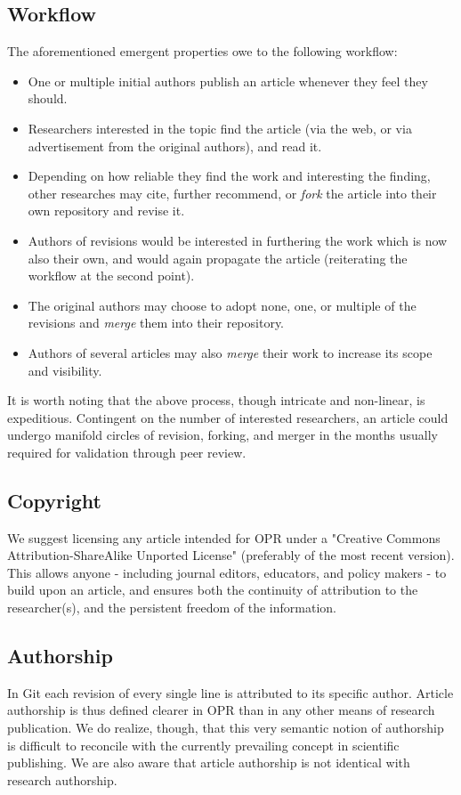 \subsection{Workflow}
The aforementioned emergent properties owe to the following workflow:
\begin{itemize}
	\item One or multiple initial authors publish an article whenever they feel they should.
	\item Researchers interested in the topic find the article (via the web, or via advertisement from the original authors), and read it.
	\item Depending on how reliable they find the work and interesting the finding, other researches may cite, further recommend, or \textit{fork} the article into their own repository and revise it.
	\item Authors of revisions would be interested in furthering the work which is now also their own, and would again propagate the article (reiterating the workflow at the second point).
	\item The original authors may choose to adopt none, one, or multiple of the revisions and \textit{merge} them into their repository.
	\item Authors of several articles may also \textit{merge} their work to increase its scope and visibility.
\end{itemize}
It is worth noting that the above process, though intricate and non-linear, is expeditious.
Contingent on the number of interested researchers, an article could undergo manifold circles of revision, forking, and merger in the months usually required for validation through peer review.
\subsection{Copyright}
We suggest licensing any article intended for OPR under a "Creative Commons Attribution-ShareAlike Unported License" (preferably of the most recent version).
This allows anyone - including journal editors, educators, and policy makers - to build upon an article, and ensures both the continuity of attribution to the researcher(s), and the persistent freedom of the information.
\subsection{Authorship}
In Git each revision of every single line is attributed to its specific author.
Article authorship is thus defined clearer in OPR than in any other means of research publication.
We do realize, though, that this very semantic notion of authorship is difficult to reconcile with the currently prevailing concept in scientific publishing.
We are also aware that article authorship is not identical with research authorship.

